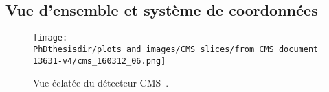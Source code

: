 \subsection{Vue d'ensemble et système de coordonnées}\label{chapter-LHC-section-CMS-subsec-overview_and_coordinates}

\begin{figure}[h]
\centering
\texttt{[image: \\PhDthesisdir/plots\_and\_images/CMS\_slices/from\_CMS\_document\_13631-v4/cms\_160312\_06.png]}
\caption[Vue éclatée du détecteur CMS.]{Vue éclatée du détecteur CMS~\cite{CMS_document_13631-v4}.}
\label{fig-chapter-LHC-section-CMS-subsec-overview_and_coordinates-vue_eclatee_CMS}
\end{figure}